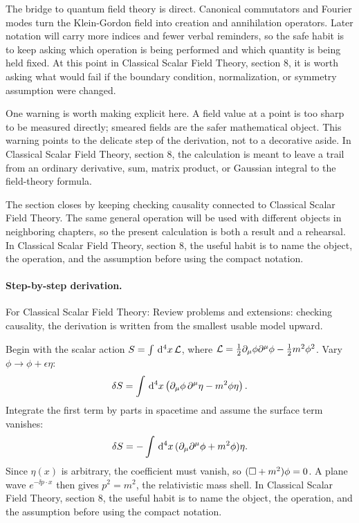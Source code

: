 The bridge to quantum field theory is direct.  Canonical commutators and Fourier modes turn the Klein-Gordon field into creation and annihilation operators.  Later notation will carry more indices and fewer verbal reminders, so the safe habit is to keep asking which operation is being performed and which quantity is being held fixed.  At this point in Classical Scalar Field Theory, section 8, it is worth asking what would fail if the boundary condition, normalization, or symmetry assumption were changed.

One warning is worth making explicit here.  A field value at a point is too sharp to be measured directly; smeared fields are the safer mathematical object.  This warning points to the delicate step of the derivation, not to a decorative aside.  In Classical Scalar Field Theory, section 8, the calculation is meant to leave a trail from an ordinary derivative, sum, matrix product, or Gaussian integral to the field-theory formula.

The section closes by keeping checking causality connected to Classical Scalar Field Theory.  The same general operation will be used with different objects in neighboring chapters, so the present calculation is both a result and a rehearsal.  In Classical Scalar Field Theory, section 8, the useful habit is to name the object, the operation, and the assumption before using the compact notation.



\paragraph{Step-by-step derivation.}

For Classical Scalar Field Theory: Review problems and extensions: checking causality, the derivation is written from the smallest usable model upward.

Begin with the scalar action \(S=\int\,\mathrm d^4x\,\mathcal L\), where \(\mathcal L=\frac12\partial_\mu\phi\partial^\mu\phi-\frac12m^2\phi^2\).  Vary \(\phi\to\phi+\epsilon\eta\):
\[
  \delta S=\int\,\mathrm d^4x\left(\partial_\mu\phi\,\partial^\mu\eta-m^2\phi\eta\right).
\]
Integrate the first term by parts in spacetime and assume the surface term vanishes:
\[
  \delta S=-\int\,\mathrm d^4x\,(\partial_\mu\partial^\mu\phi+m^2\phi)\eta.
\]
Since \(\eta(x)\) is arbitrary, the coefficient must vanish, so \((\Box+m^2)\phi=0\).  A plane wave \(e^{-\ii p\cdot x}\) then gives \(p^2=m^2\), the relativistic mass shell.  In Classical Scalar Field Theory, section 8, the useful habit is to name the object, the operation, and the assumption before using the compact notation.

